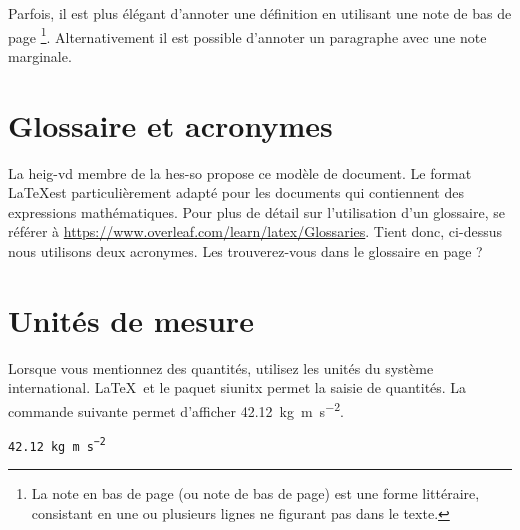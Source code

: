  Parfois, il est plus élégant d'annoter une définition en utilisant une note de bas de page \footnote{La note en bas de page (ou note de bas de page) est une forme littéraire, consistant en une ou plusieurs lignes ne figurant pas dans le texte.}. Alternativement il est possible d'annoter un paragraphe avec une note marginale.

\section{Glossaire et acronymes}

La \Gls{heig-vd} membre de la \Gls{hes-so} propose ce modèle de document. Le format \LaTeX est particulièrement adapté pour les documents qui contiennent des expressions mathématiques. Pour plus de détail sur l'utilisation d'un glossaire, se référer à \url{https://www.overleaf.com/learn/latex/Glossaries}. Tient donc, ci-dessus nous utilisons deux acronymes. Les trouverez-vous dans le glossaire en page \pageref{glossaire} ?

\section{Unités de mesure}

Lorsque vous mentionnez des quantités, utilisez les unités du système international. \LaTeX~et le paquet \textsf{siunitx} permet la saisie de quantités. La commande suivante permet d'afficher \SI{42.12}{\kilo\gram\metre\per\square\second}.\par

\texttt{\SI{42.12}{\kilo\gram\metre\per\square\second}}\par
